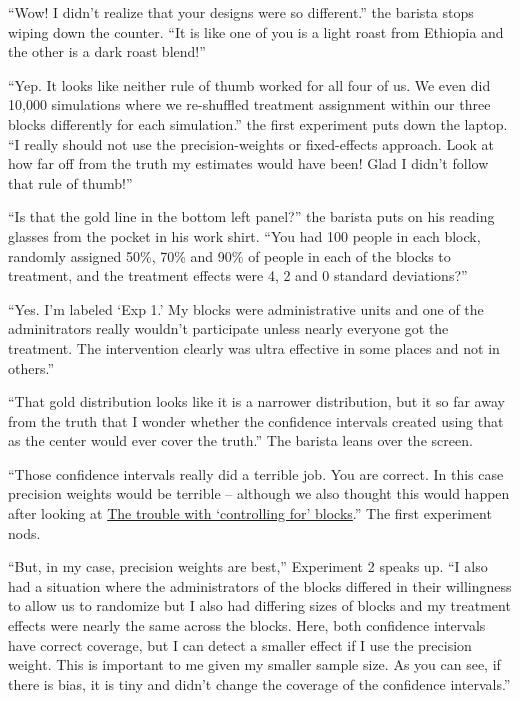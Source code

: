 \documentclass[
]{article}
\begin{document}
``Wow! I didn't realize that your designs were so different.'' the barista stops wiping down the counter. ``It is like one of you is a light roast from Ethiopia and the other is a dark roast blend!''

``Yep. It looks like neither rule of thumb worked for all four of us. We even did 10,000 simulations where we re-shuffled treatment assignment within our three blocks differently for each simulation.'' the first experiment puts down the laptop. ``I really should not use the precision-weights or fixed-effects approach. Look at how far off from the truth my estimates would have been! Glad I didn't follow that rule of thumb!''

``Is that the gold line in the bottom left panel?'' the barista puts on his reading glasses from the pocket in his work shirt. ``You had 100 people in each block, randomly assigned 50\%, 70\% and 90\% of people in each of the blocks to treatment, and the treatment effects were 4, 2 and 0 standard deviations?''

``Yes. I'm labeled `Exp 1.' My blocks were administrative units and one of the adminitrators really wouldn't participate unless nearly everyone got the treatment. The intervention clearly was ultra effective in some places and not in others.''

``That gold distribution looks like it is a narrower distribution, but it so far away from the truth that I wonder whether the confidence intervals created using that as the center would ever cover the truth.'' The barista leans over the screen.

``Those confidence intervals really did a terrible job. You are correct. In this case precision weights would be terrible -- although we also thought this would happen after looking at \href{https://declaredesign.org/blog/biased-fixed-effects.html}{The trouble with `controlling for' blocks}.'' The first experiment nods.

``But, in my case, precision weights are best,'' Experiment 2 speaks up. ``I also had a situation where the administrators of the blocks differed in their willingness to allow us to randomize but I also had differing sizes of blocks and my treatment effects were nearly the same across the blocks. Here, both confidence intervals have correct coverage, but I can detect a smaller effect if I use the precision weight. This is important to me given my smaller sample size. As you can see, if there is bias, it is tiny and didn't change the coverage of the confidence intervals.''
\end{document}

